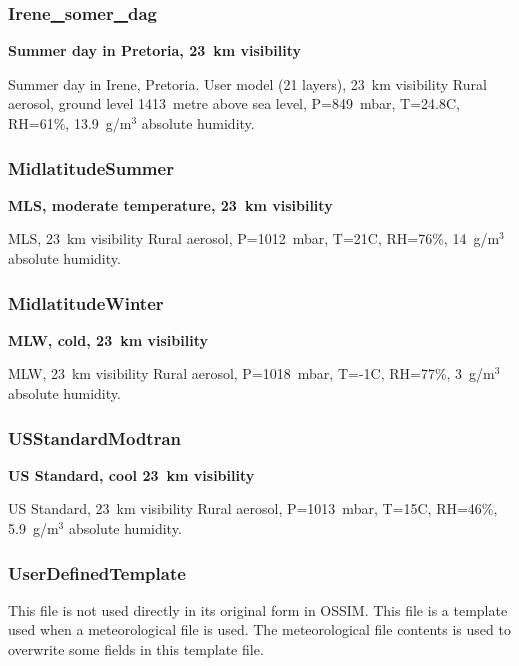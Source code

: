 \documentclass{workpackage}
\newcommand\purl[1]{\protect\url{#1}} %
\begin{document}
\subsubsection{Irene\purl{_}somer\purl{_}dag}
\label{sec:Irenesomerdag}

\textbf{Summer day in Pretoria, 23~\si{\kilo\metre} visibility}

Summer day in Irene, Pretoria.
User model (21 layers), 23~\si{\kilo\metre} visibility Rural aerosol,  ground level 1413~\si{metre} above sea level,  P=849~mbar, T=24.8C, RH=61\%, 13.9~g/m$^3$  absolute humidity.

\subsubsection{MidlatitudeSummer}
\label{sec:MidlatitudeSummer}

\textbf{MLS, moderate temperature, 23~\si{\kilo\metre} visibility}

MLS, 23~\si{\kilo\metre} visibility Rural aerosol,  P=1012~mbar, T=21C, RH=76\%, 14~g/m$^3$ absolute humidity.

\subsubsection{MidlatitudeWinter}
\label{sec:MidlatitudeWinter}

\textbf{MLW, cold,  23~\si{\kilo\metre} visibility}

MLW, 23~\si{\kilo\metre} visibility Rural aerosol,
  P=1018~mbar, T=-1C, RH=77\%, 3~g/m$^3$ absolute humidity.

\subsubsection{USStandardModtran}
\label{sec:USStandardModtran}

\textbf{US Standard, cool 23~\si{\kilo\metre} visibility}

US Standard, 23~\si{\kilo\metre} visibility Rural aerosol,
P=1013~mbar, T=15C, RH=46\%, 5.9~g/m$^3$ absolute humidity. 

\subsubsection{UserDefinedTemplate}
\label{sec:UserDefinedTemplate}

This file is not used directly in its original form in OSSIM. This file is a template used when a meteorological file is used. The meteorological file contents is used to overwrite some fields in this template file.
\end{document}

